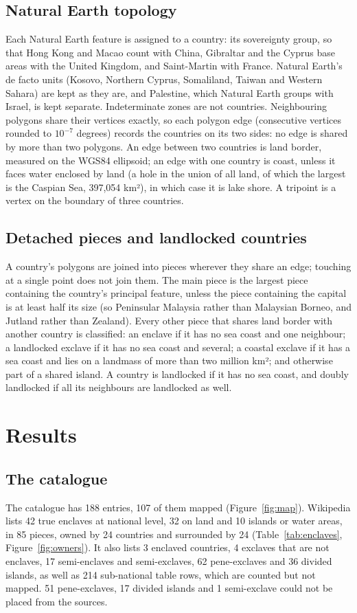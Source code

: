 \documentclass[11pt,a4paper]{article}
\begin{document}
\subsection{Natural Earth topology}
Each Natural Earth feature is assigned to a country: its sovereignty group, so that Hong Kong and Macao count with China, Gibraltar and the Cyprus base areas with the United Kingdom, and Saint-Martin with France. Natural Earth's de facto units (Kosovo, Northern Cyprus, Somaliland, Taiwan and Western Sahara) are kept as they are, and Palestine, which Natural Earth groups with Israel, is kept separate. Indeterminate zones are not countries. Neighbouring polygons share their vertices exactly, so each polygon edge (consecutive vertices rounded to $10^{-7}$ degrees) records the countries on its two sides: no edge is shared by more than two polygons. An edge between two countries is land border, measured on the WGS84 ellipsoid; an edge with one country is coast, unless it faces water enclosed by land (a hole in the union of all land, of which the largest is the Caspian Sea, 397,054 km²), in which case it is lake shore. A tripoint is a vertex on the boundary of three countries.

\subsection{Detached pieces and landlocked countries}
A country's polygons are joined into pieces wherever they share an edge; touching at a single point does not join them. The main piece is the largest piece containing the country's principal feature, unless the piece containing the capital is at least half its size (so Peninsular Malaysia rather than Malaysian Borneo, and Jutland rather than Zealand). Every other piece that shares land border with another country is classified: an enclave if it has no sea coast and one neighbour; a landlocked exclave if it has no sea coast and several; a coastal exclave if it has a sea coast and lies on a landmass of more than two million km²; and otherwise part of a shared island. A country is landlocked if it has no sea coast, and doubly landlocked if all its neighbours are landlocked as well.

\section{Results}
\subsection{The catalogue}
The catalogue has 188 entries, 107 of them mapped (Figure~\ref{fig:map}). Wikipedia lists 42 true enclaves at national level, 32 on land and 10 islands or water areas, in 85 pieces, owned by 24 countries and surrounded by 24 (Table~\ref{tab:enclaves}, Figure~\ref{fig:owners}). It also lists 3 enclaved countries, 4 exclaves that are not enclaves, 17 semi-enclaves and semi-exclaves, 62 pene-exclaves and 36 divided islands, as well as 214 sub-national table rows, which are counted but not mapped. 51 pene-exclaves, 17 divided islands and 1 semi-exclave could not be placed from the sources.
\end{document}
